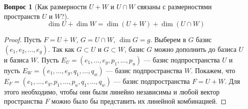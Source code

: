 \documentclass[a4paper,11pt]{article}
\theoremstyle{remark}
\theoremstyle{definition}
\newtheorem{question}{Вопрос}
\numberwithin{question}{subsection}
\begin{document}
\begin{question}[Как размерности \(U + W\) и \(U \cap W\) связаны с размерностями пространств \(U\) и \(W\)?]\(\)
\begin{equation*}
	\dim U + \dim W = \dim (U + W) + \dim(U \cap W)
\end{equation*}
\begin{proof}
Пусть \(F = U + W\), \(G = U \cap W\), \(\dim G = g\). Выберем в \(G\) базис \((e_1, e_2, \dots, e_g)\). Так как \(G \subset U\) и \(G \subset W\), базис \(G\) можно дополнить до базиса \(U\) и базиса \(W\). Пусть \(E_U = (e_1, \dots, e_g, p_1, \dots, p_u)\) --- базис подпространства \(U\) и пусть \(E_W = (e_1, \dots, e_g, q_1, \dots, q_w)\) --- базис подпространства \(W\). Покажем, что \(E_F = (e_1, \dots, e_g, p_1, \dots, p_u, q_1, \dots, q_w)\) --- базис подпространства \(F = U + W\). Для этого необходимо, чтобы они были линейно независимы и любой вектор пространства \(F\) можно было бы представить их линейной комбинацией.


\end{proof}
\end{question}
\end{document}
